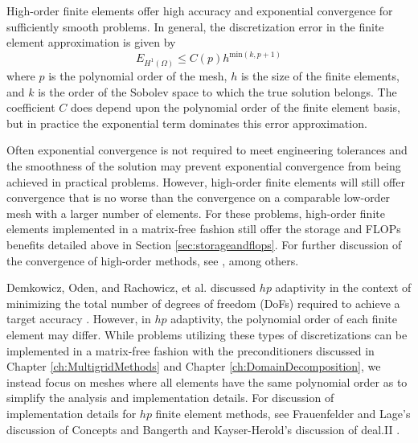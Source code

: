High-order finite elements offer high accuracy and exponential convergence for sufficiently smooth problems.
In general, the discretization error in the finite element approximation is given by
\begin{equation}
E_{H^1 \left( \Omega \right)} \leq C \left( p \right) h^{\text{min} \left( k, p + 1 \right)}
\label{eq:spectral_convergence}
\end{equation}
where $p$ is the polynomial order of the mesh, $h$ is the size of the finite elements, and $k$ is the order of the Sobolev space to which the true solution belongs.
The coefficient $C$ does depend upon the polynomial order of the finite element basis, but in practice the exponential term dominates this error approximation.

Often exponential convergence is not required to meet engineering tolerances and the smoothness of the solution may prevent exponential convergence from being achieved in practical problems.
However, high-order finite elements will still offer convergence that is no worse than the convergence on a comparable low-order mesh with a larger number of elements.
For these problems, high-order finite elements implemented in a matrix-free fashion still offer the storage and FLOPs benefits detailed above in Section \ref{sec:storageandflops}.
For further discussion of the convergence of high-order methods, see \cite{babuvska1994p,babuska1982rates,guo1986hp}, among others.

Demkowicz, Oden, and Rachowicz, et al. discussed $hp$ adaptivity in the context of minimizing the total number of degrees of freedom (DoFs) required to achieve a target accuracy \cite{demkowicz1989toward, oden1989toward, rachowicz1989toward}.
However, in $hp$ adaptivity, the polynomial order of each finite element may differ.
While problems utilizing these types of discretizations can be implemented in a matrix-free fashion with the preconditioners discussed in Chapter \ref{ch:MultigridMethods} and Chapter \ref{ch:DomainDecomposition}, we instead focus on meshes where all elements have the same polynomial order as to simplify the analysis and implementation details.
For discussion of implementation details for $hp$ finite element methods, see Frauenfelder and Lage's discussion of Concepts \cite{frauenfelder2002concepts} and Bangerth and Kayser-Herold's discussion of deal.II \cite{bangerth2009data}.